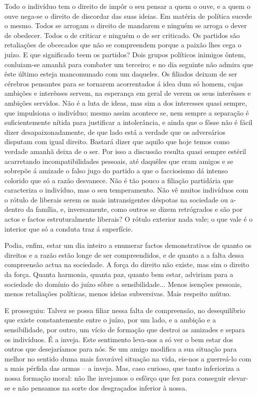 \documentclass[9pt]{article}
\begin{document}
Todo o indivíduo tem o direito de impôr o seu pensar a quem o
ouve, e a quem o ouve nega-se o direito de discordar das suas ideias.
Em ma\-té\-ria de política sucede o mesmo. Todos se arrogam o direito
de mandarem e nin\-guém se arroga o dever de obedecer. Todos o de criticar e nin\-guém o de ser criticado. Os partidos são retalia\-ções de
obcecados que não se compreendem porque a paixão lhes cega o juízo.
E que signifi\-cado teem os partidos? Dois grupos políticos inimigos ôntem, conluiam-se amanhã para combater um terceiro; e no dia seguinte não
admira que êste último esteja mancomunado com um daqueles. Os filiados
deixam de ser cérebros pensantes para se tornarem acorrentados á idea
dum só homem, cujas ambi\-ções e interêsses servem, na esperan\-ça em geral
de verem os seus interêsses e ambi\-ções servidos. Não é a luta de ideas,
mas sim a dos interesses quasi sempre, que impulsiona o indivíduo; mesmo
assim acontece se, nem sempre a separa\-ção é suficientemente nítida
para justifi\-car a intolerância, e ainda que o fôsse não é fácil dizer
desapaixonadamente, de que lado está a verdade que os adversários disputam
com igual direito. Bastará dizer que aquilo que hoje temos como verdade
a\-ma\-nhã deixa de o ser. Por isso a discussão resulta quasi sempre estéril
acarretando incompatibilidades pessoais, até da\-quê\-les que eram amigos e
se sobrepõe á amizade o falso jugo do partido a que o facciosismo dá
intenso colorido que só a razão desvanece. Não é tão pouco a filia\-ção
partidária que ca\-ra\-cte\-ri\-za o indivíduo, mas o seu temperamento. Não vê
muitos indivíduos com o rótulo de liberais serem os mais intransigentes
déspotas na sociedade ou a-dentro da fa\-mí\-lia, e, inversamente, como outros
se dizem retrógrados e são por actos e factos estruturalmente liberais?
O rótulo exterior nada vale; o que vale é o interior que só a conduta
traz á superfície.

Podia, enfim, estar um dia inteiro a enumerar factos demonstrativos de
quanto os direitos e a razão estão longe de ser compreendidos, e de quanto a
a falta dessa compreensão actua na
sociedade. A força do direito não existe, mas sim o direito da força.
Quanta harmonia, quanta paz, quanto bem estar, adviriam para
a sociedade do domínio do juízo sôbre a sensibilidade... Menos isen\-ções
pessoais, menos retalia\-ções políticas, menos ideias subversivas. Mais respeito mútuo.

E prosseguiu: Talvez se possa filiar nessa falta de compreensão,
no desequilíbrio que existe constantemente entre o juízo, por um lado,
e a ambi\-ção e a sensibilidade, por outro, um vício de forma\-ção que destroi as amizades e separa os indivíduos. É a inveja. Este sentimento
leva-nos a só ver o bem estar dos outros que desejaríamos para nós.
Se um amigo modifi\-ca a sua situa\-ção para me\-lhor no sentido duma mais
favorável situa\-ção na vida, eis-nos a guerreá-lo com a mais pérfida
das armas -- a inveja. Mas, caso curioso, que tanto inferioriza a nossa
forma\-ção moral: não lhe invejamos o esfôrço que fez para conseguir
elevar-se e não pensamos na sorte dos desgraçados inferior à nossa.
\end{document}
